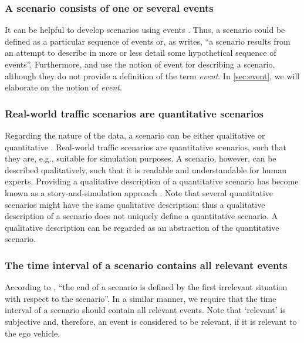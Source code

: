 \subsubsection{A scenario consists of one or several events \cite{vannotten2003updated, go2004blind, geyer2014, ulbrich2015, kahn1962, englund2016grand, schoemaker1993multiple, cuppens2002alert, bach2016modelbased}}
It can be helpful to develop scenarios using events \cite{bishop2007scentechniques}. Thus, a scenario could be defined as a particular sequence of events or, as \textcite{kahn1962} writes, ``a scenario results from an attempt to describe in more or less detail some hypothetical sequence of events''. Furthermore, \textcite{geyer2014} and \textcite{ulbrich2015} use the notion of event for describing a scenario, although they do not provide a definition of the term \emph{event}. In \cref{sec:event}, we will elaborate on the notion of \emph{event}.

\subsubsection{Real-world traffic scenarios are quantitative scenarios}
Regarding the nature of the data, a scenario can be either qualitative or quantitative \cite{vannotten2003updated}. Real-world traffic scenarios are quantitative scenarios, such that they are, e.g., suitable for simulation purposes. A scenario, however, can be described qualitatively, such that it is readable and understandable for human experts. Providing a qualitative description of a quantitative scenario has become known as a story-and-simulation approach \cite{alcamo2001scenarios}. Note that several quantitative scenarios might have the same qualitative description; thus a qualitative description of a scenario does not uniquely define a quantitative scenario. A qualitative description can be regarded as an abstraction of the quantitative scenario.

\subsubsection{The time interval of a scenario contains all relevant events}
According to \textcite{geyer2014}, ``the end of a scenario is defined by the first irrelevant situation with respect to the scenario''. In a similar manner, we require that the time interval of a scenario should contain all relevant events. Note that `relevant' is subjective and, therefore, an event is considered to be relevant, if it is relevant to the ego vehicle.

